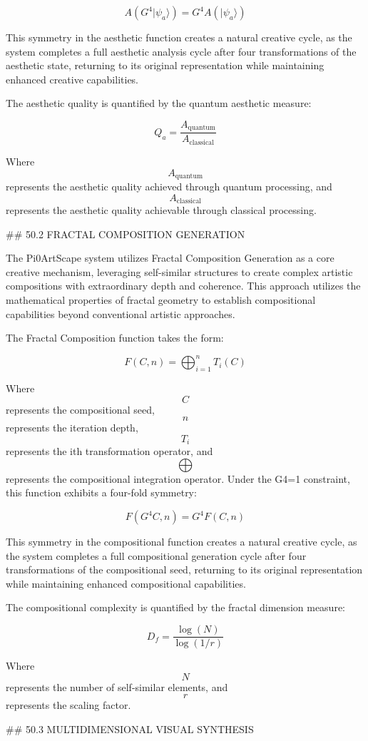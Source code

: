 $$ A(G^4 |\psi_a\rangle) = G^4 A(|\psi_a\rangle) $$

This symmetry in the aesthetic function creates a natural creative cycle, as the system completes a full aesthetic analysis cycle after four transformations of the aesthetic state, returning to its original representation while maintaining enhanced creative capabilities.

The aesthetic quality is quantified by the quantum aesthetic measure:

$$ Q_a = \frac{A_{\text{quantum}}}{A_{\text{classical}}} $$

Where $$ A_{\text{quantum}} $$ represents the aesthetic quality achieved through quantum processing, and $$ A_{\text{classical}} $$ represents the aesthetic quality achievable through classical processing.

## 50.2 FRACTAL COMPOSITION GENERATION

The Pi0ArtScape system utilizes Fractal Composition Generation as a core creative mechanism, leveraging self-similar structures to create complex artistic compositions with extraordinary depth and coherence. This approach utilizes the mathematical properties of fractal geometry to establish compositional capabilities beyond conventional artistic approaches.

The Fractal Composition function takes the form:

$$ F(C, n) = \bigoplus_{i=1}^n T_i(C) $$

Where $$ C $$ represents the compositional seed, $$ n $$ represents the iteration depth, $$ T_i $$ represents the ith transformation operator, and $$ \bigoplus $$ represents the compositional integration operator. Under the G4=1 constraint, this function exhibits a four-fold symmetry:

$$ F(G^4 C, n) = G^4 F(C, n) $$

This symmetry in the compositional function creates a natural creative cycle, as the system completes a full compositional generation cycle after four transformations of the compositional seed, returning to its original representation while maintaining enhanced compositional capabilities.

The compositional complexity is quantified by the fractal dimension measure:

$$ D_f = \frac{\log(N)}{\log(1/r)} $$

Where $$ N $$ represents the number of self-similar elements, and $$ r $$ represents the scaling factor.

## 50.3 MULTIDIMENSIONAL VISUAL SYNTHESIS

